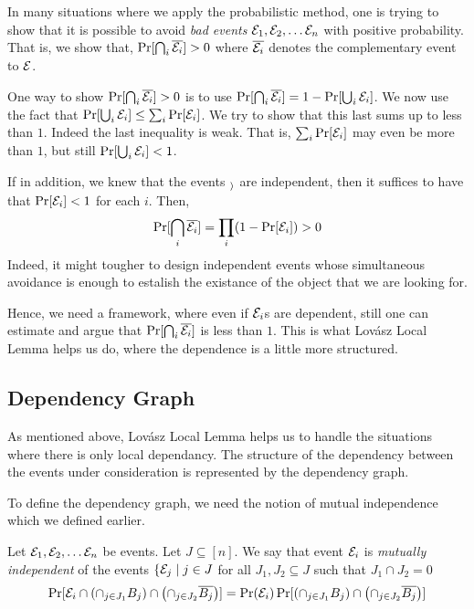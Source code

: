 In many situations where we apply the probabilistic method, one is trying to show that it is possible to avoid {\em bad events} 
${\cal E}_1, {\cal E}_2, \ldots {\cal E}_n$ with positive probability. That is, we show that, $\Pr[\bigcap_{i} \overline{{\cal E}_i}] > 0$ where $\overline{{\cal E}_i}$ denotes the complementary event to ${\cal E}$.

One way to show $\Pr[\bigcap_{i} \overline{{\cal E}_i}] > 0$ is to use $\Pr[\bigcap_{i}\overline{{\cal E}_i}] = 1-\Pr[\bigcup_{i}{\cal E}_i]$.
We now use the fact that $\Pr[\bigcup_i {\cal E}_i] \le \sum_i \Pr[{\cal E}_i]$. We try to show that this last sums up to less than $1$. Indeed the last inequality is weak. That is, $\sum_i \Pr[{\cal E}_i]$ may even be more than $1$, but still $\Pr[\bigcup_i {\cal E}_i] < 1$.


If in addition, we knew that the events $\cal_i$ are independent, then it suffices to have that $\Pr[{\cal E}_i] < 1$ for each $i$. Then, $$\Pr[\bigcap_{i} \overline{{\cal E}_i}] = \prod_i (1-\Pr[{\cal E}_i]) > 0$$
Indeed, it might tougher to design independent events whose simultaneous avoidance is enough to estalish the existance of the object that we are looking for.

Hence, we need a framework, where even if ${\cal E}_i$s are dependent, still one can estimate and argue that $\Pr[\bigcap_{i} \overline{{\cal E}_i}]$ is less than $1$. This is what Lov\'asz Local Lemma helps us do, where the dependence is a little more structured.

\subsection{Dependency Graph}

As mentioned above, Lov\'asz Local Lemma helps us to handle the situations where there is only local dependancy. The structure of the dependency between the events under consideration is represented by the dependency graph.

To define the dependency graph, we need the notion of mutual independence which we defined earlier.

\begin{definition}
Let ${\cal E}_1, {\cal E}_2, \ldots {\cal E}_n$ be events. Let $J \subseteq [n]$. We say that event ${\cal E}_i$ is \textit{mutually independent} of the events $\{{\cal E}_j \mid j \in J$ for all $J_1, J_2 \subseteq J$
such that $J_1 \cap J_2 = 0$
$$\Pr [ {\cal E}_i \cap \left( \cap_{j \in J_1} B_j \right) \cap \left( \cap_{j \in J_2} \overline{B_j} \right) ] = \Pr({\cal E}_i) \Pr[\left( \cap_{j \in J_1} B_j \right) \cap \left( \cap_{j \in J_2} \overline{B_j} \right) ] $$
\end{definition}


